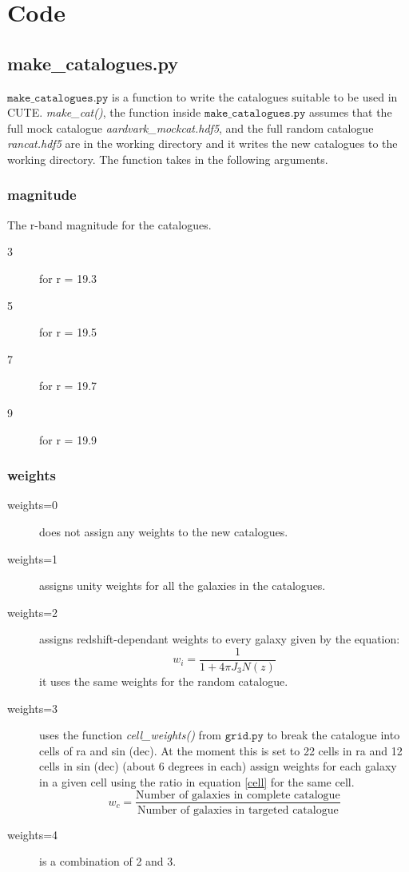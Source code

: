 \documentclass[12pt,helvetica,margin=2.5cm,a4paper,final]{iopart}
\begin{document}

\section{Code} 

\subsection{make\_catalogues.py}
$\mathtt{make\_catalogues.py}$ is a function to write the catalogues suitable to be used in CUTE. \emph{make\_cat()}, the function inside $\mathtt{make\_catalogues.py}$ assumes that the full mock catalogue \emph{aardvark\_mockcat.hdf5}, and the full random catalogue \emph{rancat.hdf5} are in the working directory and it writes the new catalogues to the working directory.  The function takes in the following arguments.
\subsubsection{magnitude}
The r-band magnitude for the catalogues.
\begin{description}
\item[3] for r = 19.3
\item[5] for r = 19.5
\item[7] for r = 19.7
\item[9] for r = 19.9
\end{description}
\subsubsection{weights}
\begin{description}
\item[weights=0] does not assign any weights to the new catalogues.
\item[weights=1] assigns unity weights for all the galaxies in the catalogues.
\item[weights=2] assigns redshift-dependant weights to every galaxy given by the equation:
\begin{equation}
w_i = \frac{1}{1 + 4 \pi J_3 N(z)}
\end{equation}
it uses the same weights for the random catalogue.
\item[weights=3] uses the function \emph{cell\_weights()} from $\mathtt{grid.py}$ to break the catalogue into cells of ra and sin (dec). At the moment this is set to 22 cells in ra and 12 cells in sin (dec) (about 6 degrees in each) assign weights for each galaxy in a given cell using the ratio in equation \ref{cell} for the same cell.
\begin{equation}
\label{cell}
w_c = \frac{\textrm{Number of galaxies in complete catalogue}}{\textrm{Number of galaxies in targeted catalogue}}
\end{equation}
\item[weights=4] is a combination of 2 and 3.

\end{description}
\end{document}
